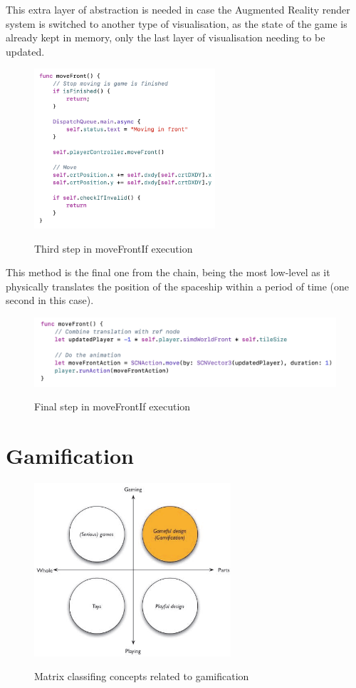\documentclass[12 pct]{report}
\begin{document}
This extra layer of abstraction is needed in case the Augmented Reality render system is switched to another type of visualisation, as the state of the game is already kept in memory, only the last layer of visualisation needing to be updated.
\begin{figure}[H]
\includegraphics[width=0.6\textwidth]{move-front-if-3}
\centering
\label{fig:feature-points}
\caption{ Third step in moveFrontIf execution }
\end{figure}

This method is the final one from the chain, being the most low-level as it physically translates the position of the spaceship within a period of time (one second in this case).
\begin{figure}[H]
\includegraphics[width=1.0\textwidth]{move-front-if-4}
\centering
\label{fig:feature-points}
\caption{ Final step in moveFrontIf execution}
\end{figure}


\section{Gamification}
\begin{figure}[H]
\includegraphics[width=0.65\textwidth]{gamification}
\centering
\label{fig:feature-points}
\caption{ Matrix classifing concepts related to gamification \cite{deterding} }
\end{figure}
\end{document}
